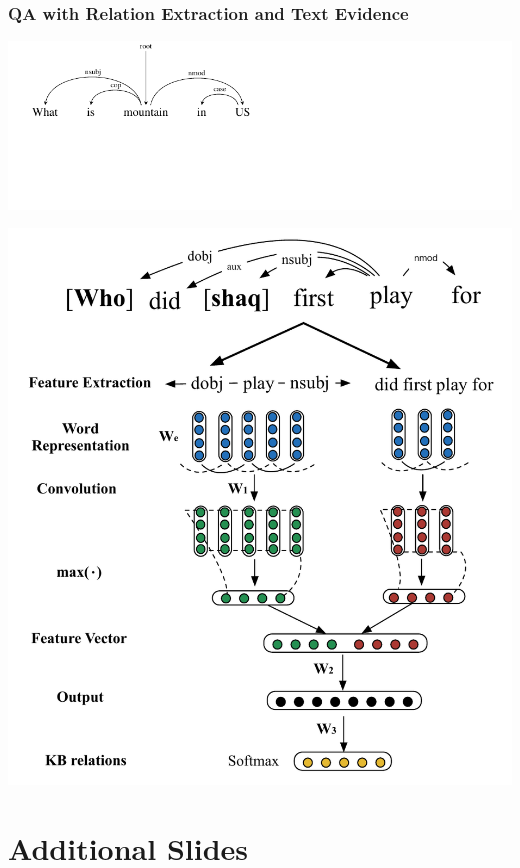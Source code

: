 \documentclass[mathserif,12pt]{beamer}
\begin{document}
\begin{frame}
\frametitle{QA with Relation Extraction and Text Evidence}
\includegraphics[trim=-12em 0em 0em 0em,clip=true,scale=0.7]{figures/natural-logic-argmax1}

\vspace{-4em}
\includegraphics[trim=-12em 0em 0em 0em,clip=true,scale=0.4]{figures/MCCNN}
\end{frame}

\section{Additional Slides}
\end{document}
